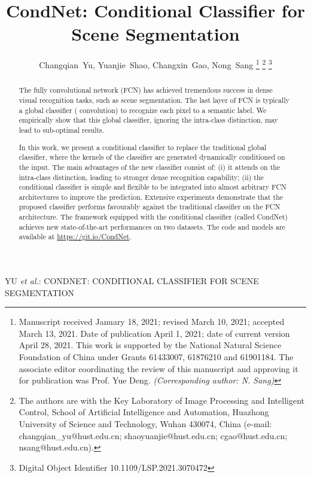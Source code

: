 \documentclass[journal]{IEEEtran}
\begin{document}
\title{CondNet: Conditional Classifier for Scene Segmentation}

\author{Changqian~Yu,
Yuanjie~Shao,
Changxin~Gao,
Nong~Sang
\thanks{Manuscript received January 18, 2021; revised March 10, 2021; accepted March 13, 2021. Date of publication April 1, 2021; date of current version April 28, 2021. This work is supported by the National Natural Science Foundation of China under Grants 61433007, 61876210 and 61901184. The associate editor coordinating the review of this manuscript and approving it for publication was Prof. Yue Deng. \textit{(Corresponding author: N. Sang)}}
\thanks{The authors are with the Key Laboratory of Image Processing and Intelligent Control, School of Artificial Intelligence and Automation, Huazhong University of Science and Technology, Wuhan 430074, China (e-mail: changqian\_yu@hust.edu.cn; shaoyuanjie@hust.edu.cn; cgao@hust.edu.cn; nsang@hust.edu.cn).}
\thanks{Digital Object Identifier 10.1109/LSP.2021.3070472}
}

{YU \MakeLowercase{\textit{et al.}}: CONDNET: CONDITIONAL CLASSIFIER FOR SCENE SEGMENTATION}
\maketitle

\begin{abstract}
The fully convolutional network (FCN) has achieved tremendous success 
in dense visual recognition tasks, 
such as scene segmentation.
The last layer of FCN is typically 
a global classifier ( convolution) 
to recognize each pixel to a semantic label.
We empirically show that
this global classifier, 
ignoring the intra-class distinction, 
may lead to sub-optimal results.

In this work, we present a conditional classifier
to replace the traditional global classifier, 
where the kernels of the classifier 
are generated dynamically 
conditioned on the input.
The main advantages of the new classifier consist of:
(i) it attends on the intra-class distinction,
leading to stronger dense recognition capability;
(ii) the conditional classifier is simple and flexible 
to be integrated into almost arbitrary FCN architectures  
to improve the prediction.
Extensive experiments demonstrate 
that the proposed classifier 
performs favourably against the traditional classifier
on the FCN architecture.
The framework
equipped with the conditional classifier
(called CondNet) 
achieves new state-of-the-art performances on two datasets.
The code and models are available at \url{https://git.io/CondNet}.

\end{abstract}
\end{document}
